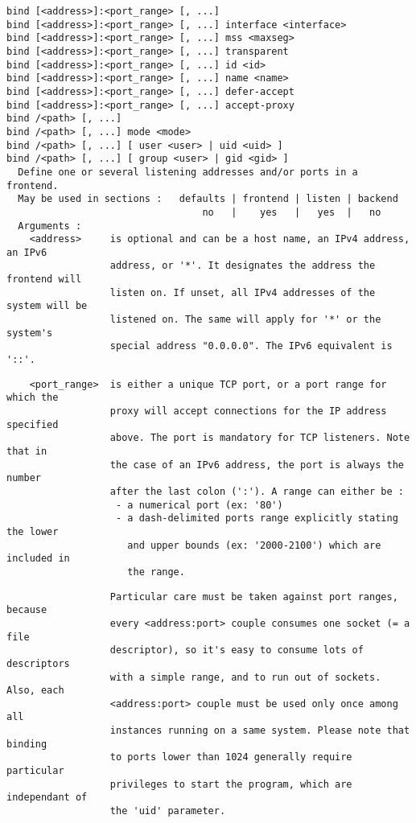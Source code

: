 \begin{verbatim}
bind [<address>]:<port_range> [, ...]
bind [<address>]:<port_range> [, ...] interface <interface>
bind [<address>]:<port_range> [, ...] mss <maxseg>
bind [<address>]:<port_range> [, ...] transparent
bind [<address>]:<port_range> [, ...] id <id>
bind [<address>]:<port_range> [, ...] name <name>
bind [<address>]:<port_range> [, ...] defer-accept
bind [<address>]:<port_range> [, ...] accept-proxy
bind /<path> [, ...]
bind /<path> [, ...] mode <mode>
bind /<path> [, ...] [ user <user> | uid <uid> ]
bind /<path> [, ...] [ group <user> | gid <gid> ]
  Define one or several listening addresses and/or ports in a frontend.
  May be used in sections :   defaults | frontend | listen | backend
                                  no   |    yes   |   yes  |   no
  Arguments :
    <address>     is optional and can be a host name, an IPv4 address, an IPv6
                  address, or '*'. It designates the address the frontend will
                  listen on. If unset, all IPv4 addresses of the system will be
                  listened on. The same will apply for '*' or the system's
                  special address "0.0.0.0". The IPv6 equivalent is '::'.
\end{verbatim}

\begin{verbatim}
    <port_range>  is either a unique TCP port, or a port range for which the
                  proxy will accept connections for the IP address specified
                  above. The port is mandatory for TCP listeners. Note that in
                  the case of an IPv6 address, the port is always the number
                  after the last colon (':'). A range can either be :
                   - a numerical port (ex: '80')
                   - a dash-delimited ports range explicitly stating the lower
                     and upper bounds (ex: '2000-2100') which are included in
                     the range.
\end{verbatim}

\begin{verbatim}
                  Particular care must be taken against port ranges, because
                  every <address:port> couple consumes one socket (= a file
                  descriptor), so it's easy to consume lots of descriptors
                  with a simple range, and to run out of sockets. Also, each
                  <address:port> couple must be used only once among all
                  instances running on a same system. Please note that binding
                  to ports lower than 1024 generally require particular
                  privileges to start the program, which are independant of
                  the 'uid' parameter.
\end{verbatim}

